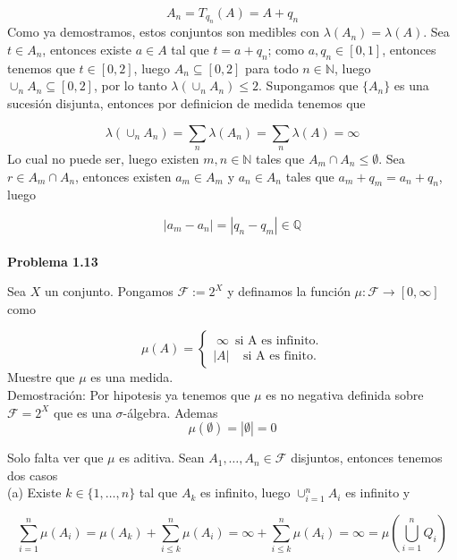 \documentclass[12pt]{article}
\begin{document}
    \[A_n = T_{q_n} (A) = A+q_n\]
    Como ya demostramos, estos conjuntos son medibles con $\lambda (A_n) = \lambda (A)$. Sea 
    $t\in A_n$, entonces existe $a\in A$ tal que $t = a+q_n$; como $a,q_n\in[0,1]$, entonces 
    tenemos que $t\in [0,2]$, luego $A_n\subseteq [0,2]$ para todo $n\in \mathbb{N}$, luego
    $\cup_n A_n \subseteq [0,2]$, por lo tanto $\lambda (\cup_n A_n) \leq 2$. 
    Supongamos que $\{A_n\}$ es una sucesi\'on disjunta, entonces por definicion de medida
    tenemos que 

    \[\lambda(\cup_n A_n) = \sum_n \lambda (A_n) = \sum_n \lambda(A) = \infty\]
    Lo cual no puede ser, luego existen $m,n\in \mathbb{N}$ tales que 
    $A_m\cap A_n \leq \emptyset$. Sea $r\in A_m\cap A_n$, entonces existen $a_m\in A_m$ y
    $a_n\in A_n$ tales que $a_m+q_m = a_n+q_n$, luego

    \[|a_m-a_n| = |q_n-q_m| \in \mathbb{Q}\]
    \\

    \textbf{Problema 1.13}

    Sea $X$ un conjunto. Pongamos $\mathcal{F} := 2^X$ y definamos la funci\'on 
    $\mu:\mathcal{F}\rightarrow [0,\infty]$ como

    \begin{equation*}
        \mu(A) = \left\{ 
        \begin{aligned}
            \; \infty \:\;\text{si A es infinito.} \\
            |A| \;\;\;\;\text{si A es finito.}
        \end{aligned}
        \right.
    \end{equation*}
    Muestre que $\mu$ es una medida.
    \\

    Demostraci\'on: Por hipotesis ya tenemos que $\mu$ es no negativa definida sobre 
    $\mathcal{F} = 2^X$ que es una $\sigma$-\'algebra. Ademas 
    \[\mu (\emptyset) = |\emptyset| = 0\]
    
    \noindent Solo falta ver que $\mu$ es aditiva. 
    Sean $A_1,\ldots,A_n\in \mathcal{F}$ disjuntos, entonces tenemos dos casos
    \\
    
    (a) Existe $k\in \{1,\ldots,n\}$ tal que $A_k$ es infinito, luego $\cup_{i=1}^n A_i$ es 
    infinito y

    \[\sum_{i=1}^n \mu(A_i) = \mu(A_k)+\sum_{i\leq k}^n \mu(A_i) = \infty+\sum_{i\leq k}^n \mu(A_i) = \infty = \mu \left(\bigcup_{i=1}^n Q_i \right)\]
\end{document}

